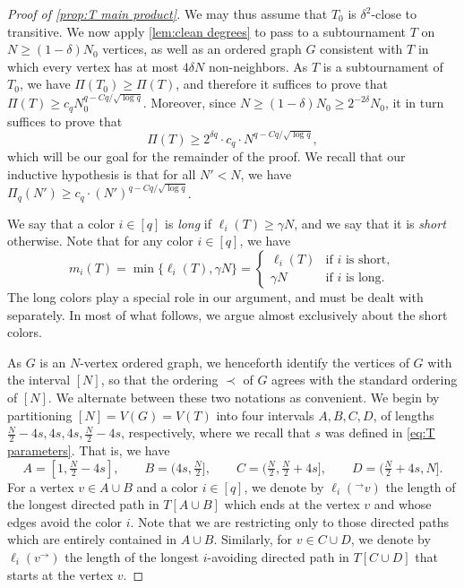 \documentclass[11pt,reqno]{amsart}
\theoremstyle{definition}
\newcommand\1{\mathbf{1}}
\let\geq\geqslant
\begin{document}
\begin{proof}[Proof of \cref{prop:T main product}]
    We may thus assume that $T_0$ is $\delta^2$-close to transitive. We now apply \cref{lem:clean degrees} to pass to a subtournament $T$ on $N \geq (1-\delta)N_0$ vertices, as well as an ordered graph $G$ consistent with $T$ in which every vertex has at most $4\delta N$ non-neighbors. As $T$ is a subtournament of $T_0$, we have $\Pi(T_0)\geq \Pi(T)$, and therefore it suffices to prove that $\Pi(T) \geq c_q N_0^{q-Cq/\sqrt{\log q}}$. Moreover, since $N \geq (1-\delta)N_0\geq 2^{-2\delta}N_0$, it in turn suffices to prove that 
    \begin{equation}\label{eq:goal}
    \Pi(T)\geq 2^{\delta q}\cdot c_q\cdot N^{q-Cq/\sqrt{\log q}},
    \end{equation}
    which will be our goal for the remainder of the proof. We recall that our inductive hypothesis is that for all $N'<N$, we have $\Pi_q(N') \geq c_q\cdot (N')^{q-Cq/\sqrt{\log q}}$. 


    We say that a color $i\in [q]$ is \emph{long} if $\ell_i(T)\geq \gamma N$, and we say that it is \emph{short} otherwise. Note that for any color $i \in [q]$, we have 
    \[
        m_i(T) = \min\{\ell_i(T), \gamma N\} = 
        \begin{cases}
            \ell_i(T) & \text{if $i$ is short},\\
            \gamma N & \text{if $i$ is long}.
        \end{cases}
    \]
    The long colors play a special role in our argument, and must be dealt with separately. In most of what follows, we argue almost exclusively about the short colors. 

    As $G$ is an $N$-vertex ordered graph, we henceforth identify the vertices of $G$ with the interval $[N]$, so that the ordering $\prec$ of $G$ agrees with the standard ordering of $[N]$. We alternate between these two notations as convenient.
    We begin by partitioning $[N]=V(G)=V(T)$ into four intervals $A,B,C,D$, of lengths $\frac N2-4s, 4s, 4s, \frac N2-4s$, respectively, where we recall that $s$ was defined in \eqref{eq:T parameters}. That is, we have
    \[
        A = [1,\tfrac N2-4s], \qquad B = (4s,\tfrac N2], \qquad C = (\tfrac N2, \tfrac N2+4s], \qquad D = (\tfrac N2+4s,N].
    \]
    For a vertex $v \in A\cup B$ and a color $i\in [q]$, we denote by $\ell_i(^\to v)$ the length of the longest directed path in $T[A \cup B]$ which ends at the vertex $v$ and whose edges avoid the color $i$. Note that we are restricting only to those directed paths which are entirely contained in $A\cup B$. Similarly, for $v\in C\cup D$, we denote by $\ell_i(v^\to)$ the length of the longest $i$-avoiding directed path in $T[C\cup D]$ that starts at the vertex $v$.


\end{proof}
\end{document}
